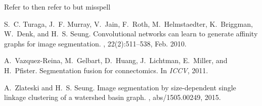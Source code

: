 \documentclass{article}
\begin{document}
  Refer to \cite{turaga2010affinity} then refer to \cite{vazquez11} but misspell \cite{zlateskiS15_asdf}

  \begin{thebibliography}{}

    S.~C. Turaga, J.~F. Murray, V.~Jain, F.~Roth, M.~Helmstaedter, K.~Briggman,
      W.~Denk, and H.~S. Seung.
    \newblock Convolutional networks can learn to generate affinity graphs for
      image segmentation.
    , 22(2):511--538, Feb. 2010.

    A.~Vazquez-Reina, M.~Gelbart, D.~Huang, J.~Lichtman, E.~Miller, and H.~Pfister.
    \newblock Segmentation fusion for connectomics.
    \newblock In {\em ICCV}, 2011.

    A.~Zlateski and H.~S. Seung.
    \newblock Image segmentation by size-dependent single linkage clustering of a
      watershed basin graph.
    , abs/1505.00249, 2015.

  \end{thebibliography}
\end{document}
